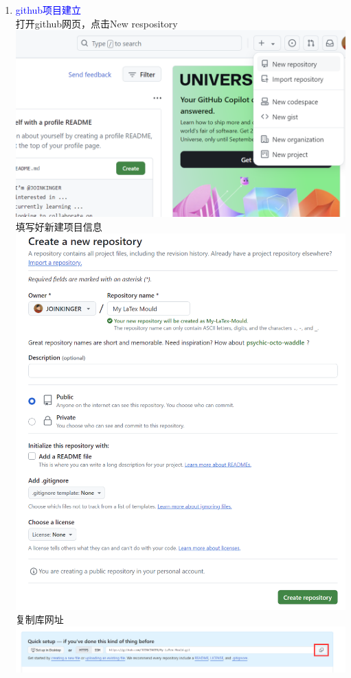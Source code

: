 \documentclass[12pt,a4paper,UTF8]{article}
\begin{document}
\begin{enumerate}
        \item \textcolor{blue}{github项目建立}\\
        打开github网页，点击New respository\\[6pt]
        \includegraphics[scale=0.25]{pictures/git/15_1.png}\\
        填写好新建项目信息\\[6pt]
        \includegraphics[scale=0.25]{pictures/git/15_2.png}\\
        复制库网址\\[6pt]
        \includegraphics[scale=0.25]{pictures/git/15_3.png}\\
        

\end{enumerate}
\end{document}
